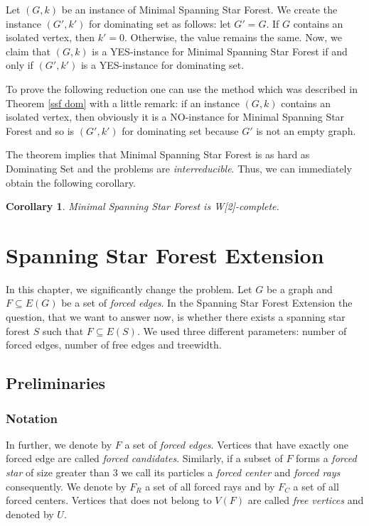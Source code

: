 \documentclass[en]{pracamgr}
\newtheorem{corollary}{Corollary}
\newenvironment{sproof}{%
	\renewcommand{\proofname}{Proof (sketch).}\proof}{\endproof}
\newcommand{\ssf}{spanning star forest}
\newcommand{\mssfp}{{\sc Minimal Spanning Star Forest}}
\newcommand{\ssfep}{{\sc Spanning Star Forest Extension}}
\newcommand{\domset}{dominating set}
\newcommand{\domsetp}{{\sc Dominating Set}}
\begin{document}
\begin{sproof}
	Let $(G,k)$ be an instance of \mssfp{}. We create the instance $(G',k')$ for \domset{} as follows: let $G'=G$. If $G$ contains an isolated vertex, then $k'=0$. Otherwise, the value remains the same. Now, we claim that $(G,k)$ is a YES-instance for \mssfp{} if and only if $(G',k')$ is a YES-instance for \domset.
	
	To prove the following reduction one can use the method which was described in Theorem \ref{ssf dom} with a little remark: if an instance $(G,k)$ contains an isolated vertex, then obviously it is a NO-instance for \mssfp{} and so is $(G',k')$ for \domset{} because $G'$ is not an empty graph.
\end{sproof}

The theorem implies that \mssfp{} is as hard as \domsetp{} and the problems are \emph{interreducible}. Thus, we can immediately obtain the following corollary.

\begin{corollary}
	\mssfp{} is {\normalfont W[2]-complete}.
\end{corollary}

\chapter{Spanning Star Forest Extension}

In this chapter, we significantly change the problem. Let $G$ be a graph and $F \subseteq E(G)$ be a set of \emph{forced edges}. In the \ssfep{} the question, that we want to answer now, is whether there exists a \ssf{} $S$ such that $F \subseteq E(S)$. We used three different parameters: number of forced edges, number of free edges and treewidth. 

\section{Preliminaries}

\subsection{Notation}

In further, we denote by $F$ a set of \emph{forced edges}. Vertices that have exactly one forced edge are called \emph{forced candidates}. Similarly, if a subset of $F$ forms a \emph{forced star} of size greater than $3$ we call its particles a \emph{forced center} and \emph{forced rays} consequently. We denote by $F_R$ a set of all forced rays and by $F_C$ a set of all forced centers. Vertices that does not belong to $V(F)$ are called \emph{free vertices} and denoted by $U$.
\end{document}
